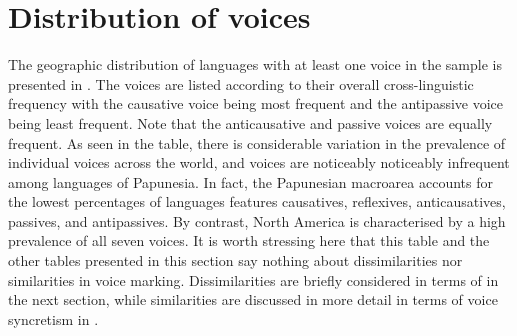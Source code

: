 \section{Distribution of voices} \label{dist:voices}
The geographic distribution of languages with at least one voice in the sample is presented in . The voices are listed according to their overall cross-linguistic frequency with the causative voice being most frequent and the antipassive voice being least frequent. Note that the anticausative and passive voices are equally frequent. As seen in the table, there is considerable variation in the prevalence of individual voices across the world, and voices are noticeably noticeably infrequent among languages of Papunesia. In fact, the Papunesian macroarea accounts for the lowest percentages of languages features causatives, reflexives, anticausatives, passives, and antipassives. By contrast, North America is characterised by a high prevalence of all seven voices. It is worth stressing here that this table and the other tables presented in this section say nothing about dissimilarities nor similarities in voice marking. Dissimilarities are briefly considered in terms of  in the next section, while similarities are discussed in more detail in terms of voice syncretism in .

